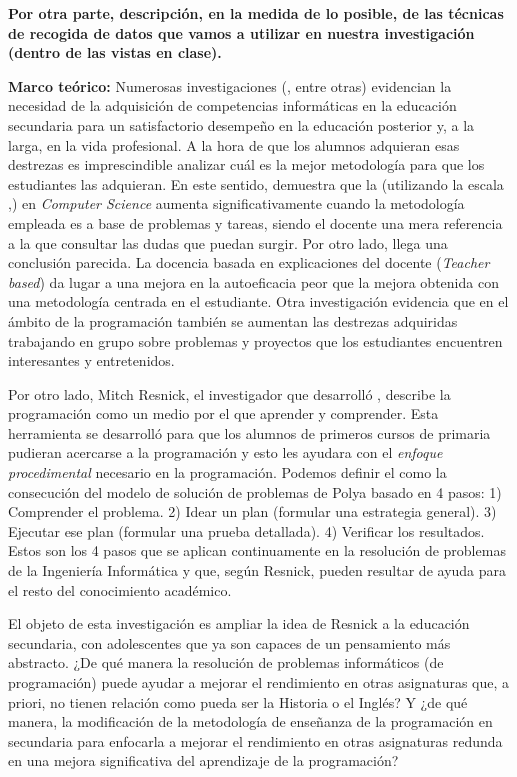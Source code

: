 \documentclass[palatino,nochap]{apuntesURJC}
\begin{document}
\textbf{
Por otra parte, descripción, en la medida de lo posible, de las técnicas de recogida de datos que vamos a utilizar en nuestra investigación (dentro de las vistas en clase).
}

\textbf{Marco teórico:}
Numerosas investigaciones (\cite{CSIsImportant},\cite{CSArguing} entre otras) evidencian la necesidad de la adquisición de competencias informáticas en la educación secundaria para un satisfactorio desempeño en la educación posterior y, a la larga, en la vida profesional.
%
A la hora de que los alumnos adquieran esas destrezas es imprescindible analizar cuál es la mejor metodología para que los estudiantes las adquieran.
%
En este sentido, \cite{StudentCenter} demuestra que la  (utilizando la escala ,\cite{CPSES}) en \textit{Computer Science} aumenta significativamente cuando la metodología empleada es a base de problemas y tareas, siendo el docente una mera referencia a la que consultar las dudas que puedan surgir.
%
\label{studentbased}
%
Por otro lado, \cite{StudentCenterVSLectures} llega una conclusión parecida. 
%
La docencia basada en explicaciones del docente (\textit{Teacher based}) da lugar a una mejora en la autoeficacia peor que la mejora obtenida con una metodología centrada en el estudiante.
%
\label{groupsbased}
%
Otra investigación \cite{ABPCS} evidencia que en el ámbito de la programación también se aumentan las destrezas adquiridas trabajando en grupo sobre problemas y proyectos que los estudiantes encuentren interesantes y entretenidos. 


Por otro lado, Mitch Resnick, el investigador que desarrolló \cite{scratch}, describe la programación como un medio por el que aprender y comprender.
%
Esta herramienta se desarrolló para que los alumnos de primeros cursos de primaria pudieran acercarse a la programación y esto les ayudara con el \textit{enfoque procedimental} necesario en la programación.
%
Podemos definir el  como la consecución del modelo de solución de problemas de Polya \cite{Polya} basado en 4 pasos:
1) Comprender el problema. 2) Idear un plan (formular una estrategia general). 3) Ejecutar ese plan (formular una prueba detallada). 4) Verificar los resultados. 
%
Estos son los 4 pasos que se aplican continuamente en la resolución de problemas de la Ingeniería Informática y que, según Resnick, pueden resultar de ayuda para el resto del conocimiento académico.

El objeto de esta investigación es ampliar la idea de Resnick a la educación secundaria, con adolescentes que ya son capaces de un pensamiento más abstracto.
%
¿De qué manera la resolución de problemas informáticos (de programación) puede ayudar a mejorar el rendimiento en otras asignaturas que, a priori, no tienen relación como pueda ser la Historia o el Inglés?
%
Y ¿de qué manera, la modificación de la metodología de enseñanza de la programación en secundaria para enfocarla a mejorar el rendimiento en otras asignaturas redunda en una mejora significativa del aprendizaje de la programación?
\end{document}
